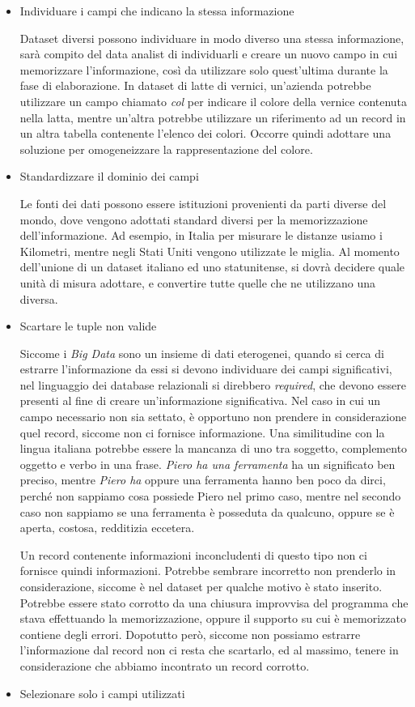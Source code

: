 \begin{itemize}
\item Individuare i campi che indicano la stessa informazione

Dataset diversi possono individuare in modo diverso una stessa informazione, sarà compito del data analist di individuarli e creare un nuovo campo in cui memorizzare l'informazione, così da utilizzare solo quest'ultima durante la fase di elaborazione. In dataset di latte di vernici, un'azienda potrebbe utilizzare un campo chiamato \emph{col} per indicare il colore della vernice contenuta nella latta, mentre un'altra potrebbe utilizzare un riferimento ad un record in un altra tabella contenente l'elenco dei colori. Occorre quindi adottare una soluzione per omogeneizzare la rappresentazione del colore.

\item Standardizzare il dominio dei campi

Le fonti dei dati possono essere istituzioni provenienti da parti diverse del mondo, dove vengono adottati standard diversi per la memorizzazione dell'informazione. Ad esempio, in Italia per misurare le distanze usiamo i Kilometri, mentre negli Stati Uniti vengono utilizzate le miglia. Al momento dell'unione di un dataset italiano ed uno statunitense, si dovrà decidere quale unità di misura adottare, e convertire tutte quelle che ne utilizzano una diversa.
\item Scartare le tuple non valide

Siccome i \emph{Big Data} sono un insieme di dati eterogenei, quando si cerca di estrarre l'informazione da essi si devono individuare dei campi significativi, nel linguaggio dei database relazionali si direbbero \emph{required}, che devono essere presenti al fine di creare un'informazione significativa. Nel caso in cui un campo necessario non sia settato, è opportuno non prendere in considerazione quel record, siccome non ci fornisce informazione. Una similitudine con la lingua italiana potrebbe essere la mancanza di uno tra soggetto, complemento oggetto e verbo in una frase. \emph{Piero ha una ferramenta} ha un significato ben preciso, mentre \emph{Piero ha} oppure {una ferramenta} hanno ben poco da dirci, perché non sappiamo cosa possiede Piero nel primo caso, mentre nel secondo caso non sappiamo se una ferramenta è posseduta da qualcuno, oppure se è aperta, costosa, redditizia eccetera. 

Un record contenente informazioni inconcludenti di questo tipo non ci fornisce quindi informazioni. Potrebbe sembrare incorretto non prenderlo in considerazione, siccome è nel dataset per qualche motivo è stato inserito. Potrebbe essere stato corrotto da una chiusura improvvisa del programma che stava effettuando la memorizzazione, oppure il supporto su cui è memorizzato contiene degli errori. Dopotutto però, siccome non possiamo estrarre l'informazione dal record non ci resta che scartarlo, ed al massimo, tenere in considerazione che abbiamo incontrato un record corrotto.
\item Selezionare solo i campi utilizzati


\end{itemize}
